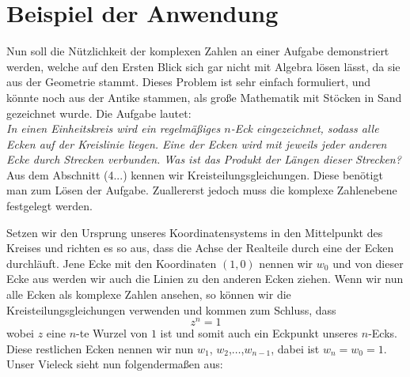 \documentclass[a4paper,12pt]{article} %
\begin{document}
\section{Beispiel der Anwendung}

Nun soll die Nützlichkeit der komplexen Zahlen an einer Aufgabe demonstriert werden, welche auf den Ersten Blick sich gar nicht mit Algebra lösen lässt, da sie aus der Geometrie stammt. Dieses Problem ist sehr einfach formuliert, und könnte noch aus der Antike stammen, als große Mathematik mit Stöcken in Sand gezeichnet wurde. Die Aufgabe lautet:\\

\noindent \textit{In einen Einheitskreis wird ein regelmäßiges $n$-Eck eingezeichnet, sodass alle Ecken auf der Kreislinie liegen.
Eine der Ecken wird mit jeweils jeder anderen Ecke durch Strecken verbunden.
Was ist das Produkt der Längen dieser Strecken?}\\


Aus dem Abschnitt (4...) kennen wir Kreisteilungsgleichungen. Diese benötigt man zum Lösen der Aufgabe. Zuallererst jedoch muss die komplexe Zahlenebene festgelegt werden. 

Setzen wir den Ursprung unseres Koordinatensystems in den Mittelpunkt des Kreises und richten es so aus, dass die Achse der Realteile durch eine der Ecken durchläuft.
Jene Ecke mit den Koordinaten $(1,0)$ nennen wir $w_0$ und von dieser Ecke aus werden wir auch die Linien zu den anderen Ecken ziehen.
Wenn wir nun alle Ecken als komplexe Zahlen ansehen, so können wir die Kreisteilungsgleichungen verwenden und kommen zum Schluss, dass
\begin{equation}
	z^n=1
\end{equation}
wobei $z$ eine $n$-te Wurzel von $1$ ist und somit auch ein Eckpunkt unseres $n$-Ecks.
Diese restlichen Ecken nennen wir nun $w_1$, $w_2$,$\dots$,$w_{n-1}$, dabei ist $w_n = w_0 = 1$.
Unser Vieleck sieht nun folgendermaßen aus:
\end{document}
